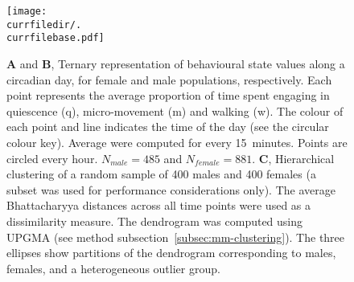 \begin{figure}[h!]
	\centering   
	\begin{minipage}[t]{0.5\textwidth}
		\vspace{0pt}
		\texttt{[image: \\currfiledir/.\\currfilebase.pdf]}
	\end{minipage}\hfill
	\begin{minipage}[t]{0.45\textwidth}
		\vspace{0pt}
	  \caption[Behavioural state modulation]{
	\textbf{A} and \textbf{B}, Ternary representation of behavioural state values along a circadian day, for female and male populations, respectively.
	Each point represents the average proportion of time spent engaging in quiescence (q), micro-movement (m) and walking (w). 
	The colour of each point and line indicates the time of the day (see the circular colour key). Average were computed for every 15~minutes. Points are circled every hour.
	$N_{male} = 485$ and $N_{female} = 881$.
	\textbf{C}, Hierarchical clustering of a random sample of 400 males and 400 females (a subset was used for performance considerations only).
	The average Bhattacharyya distances across all time points were used as a dissimilarity measure.
	The dendrogram was computed using UPGMA (see method subsection~\ref{subsec:mm-clustering}).
	The three ellipses show partitions of the dendrogram corresponding to males, females, and a heterogeneous outlier group.
	\label{fig:\currfilebase}
	}
	\end{minipage}
\end{figure}
